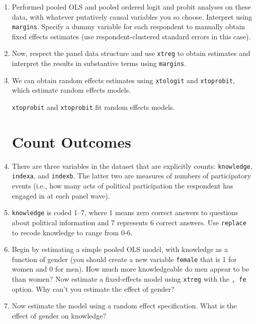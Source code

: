\documentclass[a4paper,12pt]{article}
\begin{document}
\begin{enumerate}
\item Performed pooled OLS and pooled ordered logit and probit analyses on these data, with whatever putatively causal variables you so choose. Interpret using \texttt{margins}. Specify a dummy variable for each respondent to manually obtain fixed effects estimates (use respondent-clustered standard errors in this case).

\item Now, respect the panel data structure and use \texttt{xtreg} to obtain estimates and interpret the results in substantive terms using \texttt{margins}.

\item We can obtain random effects estimates using \texttt{xtologit} and \texttt{xtoprobit}, which estimate random effects models.








\texttt{xtoprobit} and \texttt{xtoprobit} fit random effects models.

\section{Count Outcomes}

\item There are three variables in the dataset that are explicitly counts: \texttt{knowledge}, \texttt{indexa}, and \texttt{indexb}. The latter two are measures of numbers of participatory events (i.e., how many acts of political participation the respondent has engaged in at each panel wave).

\item \texttt{knowledge} is coded 1--7, where 1 means zero correct answers to questions about political information and 7 represents 6 correct answers. Use \texttt{replace} to recode knowledge to range from 0-6.

\item Begin by estimating a simple pooled OLS model, with knowledge as a function of gender (you should create a new variable \texttt{female} that is 1 for women and 0 for men). How much more knowledgeable do men appear to be than women? Now estimate a fixed-effects model using \texttt{xtreg} with the \texttt{, fe} option. Why can't you estimate the effect of gender?

\item Now estimate the model using a random effect specification. What is the effect of gender on knowledge?


\end{enumerate}
\end{document}
